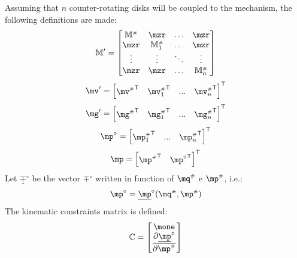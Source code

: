 \documentclass[a4paper,11pt,brazil,fleqn]{article}
\begin{document}
Assuming that $n$ counter-rotating disks will be coupled to the mechanism, the following definitions are made:
\begin{equation}\label{eq:M'}
\mM' =
\begin{bmatrix}
\mM\ssh &  \mzr  & \ldots & \mzr\\
\mzr  &  \mM\ssh_1 & \ldots & \mzr\\
\vdots & \vdots & \ddots & \vdots\\
\mzr  &   \mzr       &\ldots & \mM\ssh_{n}
\end{bmatrix}
\end{equation}
\begin{equation}\label{eq:v'}
\mv' = \begin{bmatrix}
{\mv\ssh}^\msT & {\mv\ssh_1}^\msT & ... & {\mv\ssh_{n}}^\msT
\end{bmatrix}^\msT
\end{equation}
\begin{equation}\label{eq:g'}
\mg' = \begin{bmatrix}
{\mg\ssh}^\msT & {\mg\ssh_1}^\msT & ... & {\mg\ssh_{n}}^\msT
\end{bmatrix}^\msT
\end{equation}
\begin{equation}\label{eq:pº}
\mp^\circ = \begin{bmatrix}
{\mp\ssh_1}^\msT & ... & {\mp\ssh_{n}}^\msT
\end{bmatrix}^\msT
\end{equation}
\begin{equation}\label{eq:p}
\mp = \begin{bmatrix}
{\mp\ssh}^\msT & {\mp^\circ}^\msT
\end{bmatrix}^\msT
\end{equation}
Let $\underline{\mp}^\circ$ be the vector $\mp^\circ$ written in function of $\mq\ssh$ e $\mp\ssh$, i.e.:
\begin{equation}\label{eq:pº_}
\mp^\circ = \underline{\mp}^\circ(\mq\ssh, \mp\ssh) 
\end{equation}
The kinematic constraints matrix is defined:
\begin{equation}\label{eq:C}
\mC =
\begin{bmatrix}
\mone \\
\displaystyle\frac{\partial \underline{\mp}^\circ}{\partial \mp\ssh}
\end{bmatrix}
\end{equation}
\end{document}

